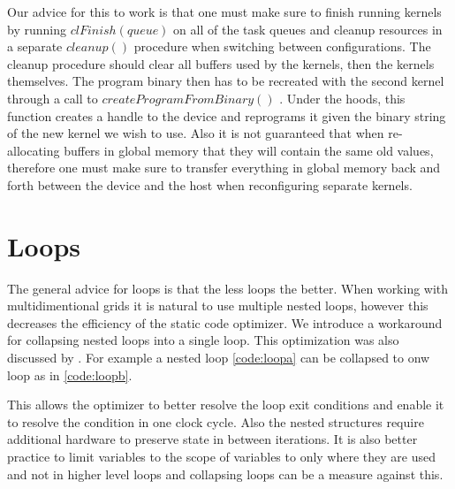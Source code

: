 Our advice for this to work is that one must make sure to finish running kernels by running $ clFinish(queue) $ on all of the task queues and cleanup resources in a separate $ cleanup()$ procedure when switching between configurations. The cleanup procedure should clear all buffers used by the kernels, then the kernels themselves. The program binary then has to be recreated with the second kernel through a call to $createProgramFromBinary()$ . Under the hoods, this function creates a handle to the device and reprograms it given the binary string of the new kernel we wish to use. Also it is not guaranteed that when re-allocating buffers in global memory that they will contain the same old values, therefore one must make sure to transfer everything in global memory back and forth between the device and the host when reconfiguring separate kernels.

\section{Loops}

The general advice for loops is that the less loops the better. When working with multidimentional grids it is natural to use multiple nested loops, however this decreases the efficiency of the static code optimizer. We introduce a workaround for collapsing nested loops into a single loop. This optimization was also discussed by \cite{2018combined}. For example a nested loop \ref{code:loopa} can be collapsed to onw loop as in \ref{code:loopb}.

\begin{minipage}{0.5\textwidth}
  
 \label{code:loopa}   
  
\end{minipage}%
\vspace{0pt}
\hspace{5pt}
\begin{minipage}{0.5\textwidth}
 
 \label{code:loopb} 
 
\end{minipage}

This allows the optimizer to better resolve the loop exit conditions and enable it to resolve the condition in one clock cycle. Also the nested structures require additional hardware to preserve state in between iterations. It is also better practice to limit variables to the scope of variables to only where they are used and not in higher level loops and collapsing loops can be a measure against this.


